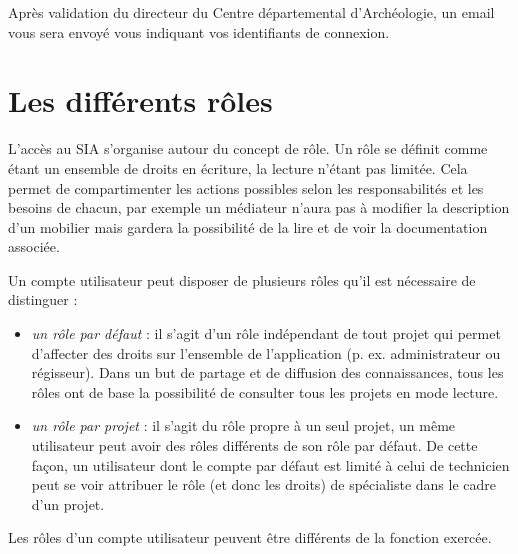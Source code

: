 \documentclass[letterpaper,10pt,french]{sphinxmanual}
\begin{document}
Après validation du directeur du Centre départemental d’Archéologie, un email vous sera envoyé vous indiquant vos identifiants de connexion.


\section{Les différents rôles}
\label{manuel/connexion:les-differents-roles}
L'accès au SIA s'organise autour du concept de rôle. Un rôle se définit comme étant un ensemble de droits en écriture, la lecture n'étant pas limitée. Cela permet de compartimenter les actions possibles selon les responsabilités et les besoins de chacun, par exemple un médiateur n'aura pas à modifier la description d'un mobilier mais gardera la possibilité de la lire et de voir la documentation associée.

Un compte utilisateur peut disposer de plusieurs rôles qu'il est nécessaire de distinguer :
\begin{itemize}
\item {} 
\emph{un rôle par défaut} : il s'agit d'un rôle indépendant de tout projet qui permet d'affecter des droits sur l'ensemble de l'application (p. ex. administrateur ou régisseur). Dans un but de partage et de diffusion des connaissances, tous les rôles ont de base la possibilité de consulter tous les projets en mode lecture.

\item {} 
\emph{un rôle par projet} : il s'agit du rôle propre à un seul projet, un même utilisateur peut avoir des rôles différents de son rôle par défaut. De cette façon, un utilisateur dont le compte par défaut est limité à celui de technicien peut se voir attribuer le rôle (et donc les droits) de spécialiste dans le cadre d'un projet.

\end{itemize}

Les rôles d'un compte utilisateur peuvent être différents de la fonction exercée.
\end{document}
